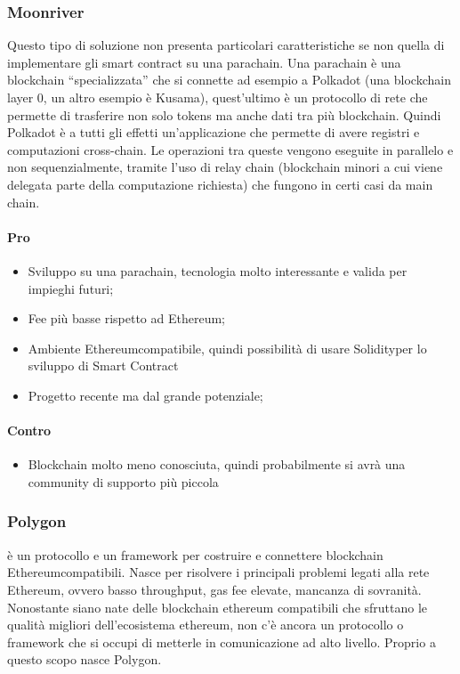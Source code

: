 		\subsubsection{Moonriver}
		Questo tipo di soluzione non presenta particolari caratteristiche se non quella di implementare gli smart contract su una parachain. Una parachain è una blockchain “specializzata” che si connette ad esempio a Polkadot (una blockchain layer 0, un altro esempio è Kusama), quest’ultimo è un protocollo di rete che permette di trasferire non solo tokens ma anche dati tra più blockchain. Quindi Polkadot è a tutti gli effetti un’applicazione che permette di avere registri e computazioni cross-chain.
		Le operazioni tra queste vengono eseguite in parallelo e non sequenzialmente, tramite l'uso di relay chain (blockchain minori a cui viene delegata parte della computazione richiesta) che fungono in certi casi da main chain.
		\paragraph{Pro}
		\begin{itemize}
			\item Sviluppo su una parachain, tecnologia molto interessante e valida per impieghi futuri;
			\item Fee più basse rispetto ad Ethereum\glo;
			\item Ambiente Ethereum\glo compatibile, quindi possibilità di usare Solidity\glo per lo sviluppo di Smart Contract
			\item Progetto recente ma dal grande potenziale;
		\end{itemize}
		\paragraph{Contro}
		\begin{itemize}
			\item Blockchain molto meno conosciuta, quindi probabilmente si avrà una community di supporto più piccola
		\end{itemize}
		
		\subsubsection{Polygon}
		è un protocollo e un framework per costruire e connettere blockchain Ethereum\glo compatibili. Nasce per risolvere i principali problemi legati alla rete Ethereum\glo, ovvero basso throughput, gas fee elevate, mancanza di sovranità.
		Nonostante siano nate delle blockchain ethereum compatibili che sfruttano le qualità migliori dell’ecosistema ethereum\glo, non c’è ancora un protocollo o framework che si occupi di metterle in comunicazione ad alto livello. Proprio a questo scopo nasce Polygon.
	
